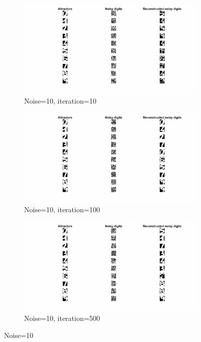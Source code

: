 \documentclass{article}
\begin{document}
\begin{figure}[h!]
     \centering
     \begin{subfigure}[b]{0.3\textwidth}
         \centering
         \includegraphics[width=\textwidth]{lab2/noise10ite10.pdf}
         \caption{Noise=10, iteration=10}
         \label{fig:noise10ite10}
     \end{subfigure}
     \hfill
     \begin{subfigure}[b]{0.3\textwidth}
         \centering
         \includegraphics[width=\textwidth]{lab2/noise10ite100.pdf}
         \caption{Noise=10, iteration=100}
         \label{fig:noise10ite100}
     \end{subfigure}
     \hfill
     \begin{subfigure}[b]{0.3\textwidth}
         \centering
         \includegraphics[width=\textwidth]{lab2/noise10ite500.pdf}
         \caption{Noise=10, iteration=500}
         \label{fig:noise10ite500}
     \end{subfigure}
        \caption{Noise=10}
        \label{fig:hopnoise10}
\end{figure}
\end{document}
